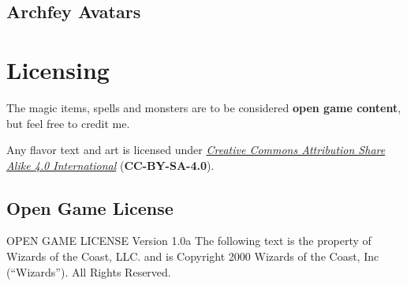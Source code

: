 \documentclass[letter,10pt,twocolumn,openany]{dndbook}
\begin{document}
\section{Archfey Avatars}


\backmatter

\chapter{Licensing}

The magic items, spells and monsters are to be considered \textbf{open game content}, but feel free to credit me.

Any flavor text and art is licensed under \href{https://creativecommons.org/licenses/by-sa/4.0/legalcode}{\textit{Creative Commons Attribution Share Alike 4.0 International}} (\textbf{CC-BY-SA-4.0}).



\section{Open Game License}

OPEN GAME LICENSE Version 1.0a The following text is the property of Wizards of the Coast, LLC. and is Copyright 2000 Wizards of the Coast, Inc (“Wizards”). All Rights Reserved.
\end{document}
